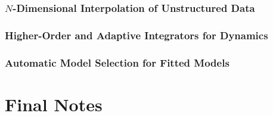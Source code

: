 \subsubsection{$N$-Dimensional Interpolation of Unstructured Data}

\subsubsection{Higher-Order and Adaptive Integrators for Dynamics}

\subsubsection{Automatic Model Selection for Fitted Models}

\section{Final Notes}